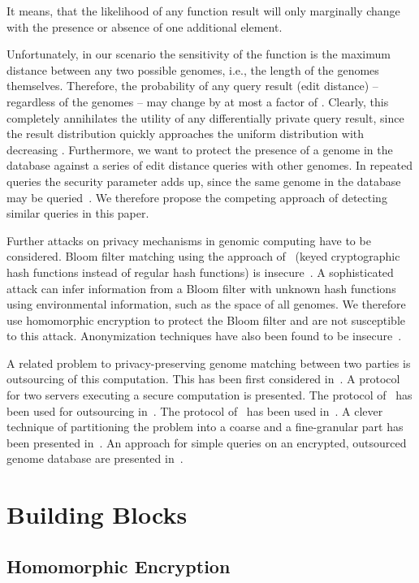\documentclass{llncs}
\begin{document}
It means, that the likelihood of any function result will only marginally change with the presence or absence of one additional element. 

Unfortunately, in our scenario the sensitivity of the function  is the maximum distance between any two possible genomes, i.e., the length of the genomes themselves.
Therefore, the probability of any query result (edit distance) -- regardless of the genomes -- may change by at most a factor of .
Clearly, this completely annihilates the utility of any differentially private query result, since the result distribution quickly approaches the uniform distribution with decreasing .
Furthermore, we want to protect the presence of a genome in the database against a series of edit distance queries with other genomes.
In repeated queries the security parameter  adds up, since the same genome in the database may be queried~\cite{McS09}.
We therefore propose the competing approach of detecting similar queries in this paper.

Further attacks on privacy mechanisms in genomic computing have to be considered.
Bloom filter matching using the approach of~\cite{BelChe04} (keyed cryptographic hash functions instead of regular hash functions) is insecure~\cite{KuzKan11}.
A sophisticated attack can infer information from a Bloom filter with unknown hash functions using environmental information, such as the space of all genomes.
We therefore use homomorphic encryption to protect the Bloom filter and are not susceptible to this attack.
Anonymization techniques have also been found to be insecure~\cite{WanLi09}.

A related problem to privacy-preserving genome matching between two parties is outsourcing of this computation.
This has been first considered in~\cite{AtaLi04}.
A protocol for two servers executing a secure computation is presented.
The protocol of~\cite{TroKat07} has been used for outsourcing in~\cite{BlaAli10}.
The protocol of~\cite{JhaKru08} has been used in~\cite{BlaAta12}.
A clever technique of partitioning the problem into a coarse and a fine-granular part has been presented in~\cite{ChePen12}.
An approach for simple queries on an encrypted, outsourced genome database are presented in~\cite{KanJia08}.

\section{Building Blocks}
\label{sec:blocks}

\subsection{Homomorphic Encryption}
\label{sec:he}
\end{document}
